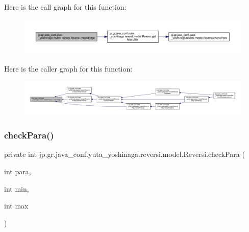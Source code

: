 Here is the call graph for this function\+:
\nopagebreak
\begin{figure}[H]
\begin{center}
\leavevmode
\includegraphics[width=350pt]{classjp_1_1gr_1_1java__conf_1_1yuta__yoshinaga_1_1reversi_1_1model_1_1_reversi_a4874c6523adfdfd42dfbd625f5e3fe7a_cgraph}
\end{center}
\end{figure}
Here is the caller graph for this function\+:
\nopagebreak
\begin{figure}[H]
\begin{center}
\leavevmode
\includegraphics[width=350pt]{classjp_1_1gr_1_1java__conf_1_1yuta__yoshinaga_1_1reversi_1_1model_1_1_reversi_a4874c6523adfdfd42dfbd625f5e3fe7a_icgraph}
\end{center}
\end{figure}
\mbox{\label{classjp_1_1gr_1_1java__conf_1_1yuta__yoshinaga_1_1reversi_1_1model_1_1_reversi_afbad8b2c3b2423a7490f9a3b636584d3}} 
\subsubsection{\texorpdfstring{check\+Para()}{checkPara()}}
{\footnotesize\ttfamily private int jp.\+gr.\+java\+\_\+conf.\+yuta\+\_\+yoshinaga.\+reversi.\+model.\+Reversi.\+check\+Para (\begin{DoxyParamCaption}\item[{int}]{para,  }\item[{int}]{min,  }\item[{int}]{max }\end{DoxyParamCaption})\hspace{0.3cm}{\ttfamily [private]}}



